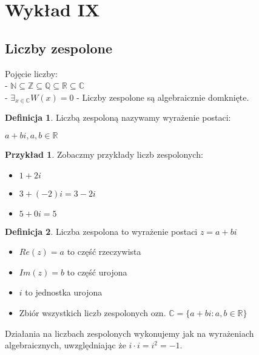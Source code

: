 \documentclass{article}
\theoremstyle{definition}
\newtheorem{de}{Definicja}[subsection]
\theoremstyle{definition}
\theoremstyle{definition}
\newtheorem{pk}{Przykład}[subsection]
\theoremstyle{definition}
\begin{document}
\section{Wykład IX}

\subsection{Liczby zespolone}

Pojęcie liczby:\\
- $\mathbb{N}\subseteq \mathbb{Z} \subseteq \mathbb{Q} \subseteq \mathbb{R} \subseteq \mathbb{C}$\\
- $\exists_{x\in \mathbb{C}} W(x)=0$ - Liczby zespolone są algebraicznie domknięte.

\begin{de}
    Liczbą zespoloną nazywamy wyrażenie postaci:
    \begin{center}
        $a+bi, a,b\in\mathbb{R}$
    \end{center}
\end{de}

\begin{pk}
    Zobaczmy przykłady liczb zespolonych:
    \begin{itemize}
        \item $1+2i$
        \item $3+(-2)i = 3-2i$
        \item $5+0i = 5$
    \end{itemize}
\end{pk}

\begin{de}
    Liczba zespolona to wyrażenie postaci $z=a+bi$
    \begin{itemize}
        \item $Re(z)=a$ to część rzeczywista
        \item $Im(z)=b$ to część urojona
        \item $i$ to jednostka urojona
        \item Zbiór wszystkich liczb zespolonych ozn. $\mathbb{C} = \{a+bi: a,b\in\mathbb{R}\}$
    \end{itemize}
\end{de}

Działania na liczbach zespolonych wykonujemy jak na wyrażeniach algebraicznych, uwzględniając że $i\cdot i=i^2=-1$.\\
\end{document}
